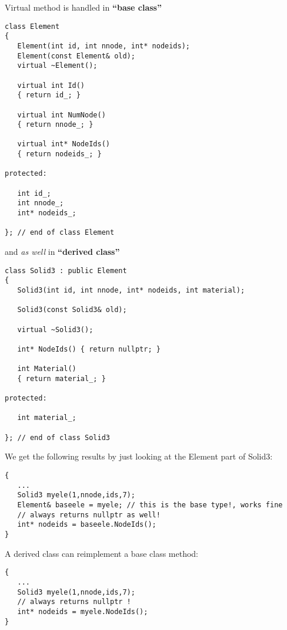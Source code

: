 Virtual  method is handled in \textbf{``base class''}\\
\begin{boxedminipage}{\linewidth}
\begin{verbatim}
class Element
{
   Element(int id, int nnode, int* nodeids);
   Element(const Element& old);
   virtual ~Element();

   virtual int Id()
   { return id_; }

   virtual int NumNode()
   { return nnode_; }

   virtual int* NodeIds()
   { return nodeids_; }

protected:

   int id_;
   int nnode_;
   int* nodeids_;

}; // end of class Element
\end{verbatim}
\end{boxedminipage}
and \emph{as well} in \textbf{``derived class''}\\
\begin{boxedminipage}{\linewidth}
\begin{verbatim}
class Solid3 : public Element
{
   Solid3(int id, int nnode, int* nodeids, int material);

   Solid3(const Solid3& old);

   virtual ~Solid3();

   int* NodeIds() { return nullptr; }

   int Material()
   { return material_; }

protected:

   int material_;

}; // end of class Solid3
\end{verbatim}
\end{boxedminipage}
We get the following results by just looking at the Element part of Solid3:\\
\begin{boxedminipage}{\linewidth}
\begin{verbatim}
{
   ...
   Solid3 myele(1,nnode,ids,7);
   Element& baseele = myele; // this is the base type!, works fine
   // always returns nullptr as well!
   int* nodeids = baseele.NodeIds();
}
\end{verbatim}
\end{boxedminipage}
A derived class can reimplement a base class method:\\
\begin{boxedminipage}{\linewidth}
\begin{verbatim}
{
   ...
   Solid3 myele(1,nnode,ids,7);
   // always returns nullptr !
   int* nodeids = myele.NodeIds();
}
\end{verbatim}
\end{boxedminipage}
